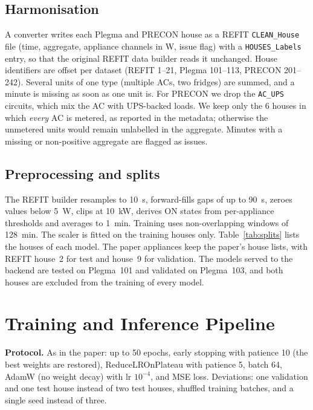 \documentclass[conference]{IEEEtran}
\begin{document}
\subsection{Harmonisation}
A converter writes each Plegma and PRECON house as a REFIT \texttt{CLEAN\_House} file (time,
aggregate, appliance channels in W, issue flag) with a \texttt{HOUSES\_Labels} entry, so that the
original REFIT data builder reads it unchanged. House identifiers are offset per dataset (REFIT
1--21, Plegma 101--113, PRECON 201--242). Several units of one type (multiple ACs, two fridges)
are summed, and a minute is missing as soon as one unit is. For PRECON we drop the
\texttt{AC\_UPS} circuits, which mix the AC with UPS-backed loads. We keep only the 6 houses in
which \emph{every} AC is metered, as reported in the metadata; otherwise the unmetered units would
remain unlabelled in the aggregate. Minutes with a missing or non-positive aggregate are flagged as
issues.

\subsection{Preprocessing and splits}
The REFIT builder resamples to 10~s, forward-fills gaps of up to 90~s, zeroes values below 5~W,
clips at 10~kW, derives ON states from per-appliance thresholds and averages to 1~min.
Training uses non-overlapping windows of 128~min. The scaler is fitted on the training houses
only. Table~\ref{tab:splits} lists the houses of each model. The paper appliances keep the paper's
house lists, with REFIT house~2 for test and house~9 for validation. The models served to the
backend are tested on Plegma~101 and validated on Plegma~103, and both houses are excluded from
the training of every model.

\begin{table}[t]
\centering\footnotesize\setlength{\tabcolsep}{3pt}
\caption{Training houses per model (count per dataset), validation and test house.}
\label{tab:splits}
\resizebox{\columnwidth}{!}{}
\end{table}

\section{Training and Inference Pipeline}\label{sec:pipeline}
\textbf{Protocol.} As in the paper: up to 50 epochs, early stopping with patience 10 (the best
weights are restored), ReduceLROnPlateau with patience 5, batch 64, AdamW (no weight decay) with
lr $10^{-4}$, and MSE loss. Deviations: one validation and one test house instead of two test
houses, shuffled training batches, and a single seed instead of three.
\end{document}
